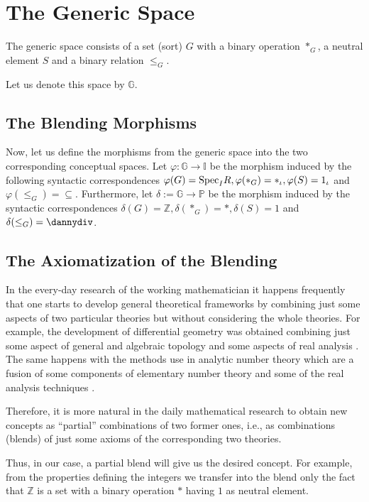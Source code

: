 \section{The Generic Space}

The generic space consists of a set (sort) $G$ with a binary operation
$*_G$, a neutral element $S$ and a binary relation $\leq_G$.

  Let us denote this space by $\mathbb{G}$.

\subsection{The Blending Morphisms}
Now, let us define the morphisms from the generic space into the two corresponding conceptual spaces. Let $\varphi: \mathbb{G}\rightarrow \mathbb{I}$ be the morphism induced by the following syntactic correspondences $\varphi(G)={\rm Spec}_IR,\varphi(*_G)=*_{\iota}, \varphi(S)=1_{\iota}$ and $\varphi(\leq_G)=\subseteq$.
\newline\indent
Furthermore, let $\delta:=\mathbb{G}\rightarrow\mathbb{P}$ be the morphism induced by the syntactic correspondences $\delta(G)=\mathbb{Z}, \delta(*_G)=*, \delta(S)=1$ and $\delta(\leq_G)= \dannydiv$.

\subsection{The Axiomatization of the Blending}
In the every-day research of the working mathematician it happens
frequently that one starts to develop general theoretical frameworks
by combining just some aspects of two particular theories but without
considering the whole theories. For example, the development of
differential geometry was obtained combining just some aspect of
general and algebraic topology and some aspects of real analysis
\cite{VelCad05}. The same happens with the methods use in
analytic number theory which are a fusion of some components of
elementary number theory and some of the real analysis techniques
\parencite{Apostol76}.

Therefore, it is more natural in the daily mathematical research to
obtain new concepts as ``partial'' combinations of two former ones,
i.e., as combinations (blends) of just some axioms of the
corresponding two theories.
 
Thus, in our case, a partial blend will give us the desired
concept. For example, from the properties defining the integers we
transfer into the blend only the fact that $\mathbb{Z}$ is a set with
a binary operation $*$ having $1$ as neutral element.

